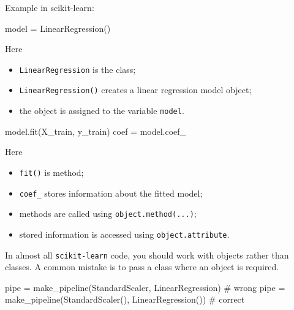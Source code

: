 \documentclass[
  letterpaper,
  DIV=11,
  numbers=noendperiod]{scrreprt}
\newenvironment{Shaded}{\begin{snugshade}}{\end{snugshade}}
\newcommand{\CommentTok}[1]{\textcolor[rgb]{0.37,0.37,0.37}{#1}}
\newcommand{\NormalTok}[1]{\textcolor[rgb]{0.00,0.23,0.31}{#1}}
\newcommand{\OperatorTok}[1]{\textcolor[rgb]{0.37,0.37,0.37}{#1}}
\providecommand{\tightlist}{%
  \setlength{\itemsep}{0pt}\setlength{\parskip}{0pt}}
\theoremstyle{definition}
\theoremstyle{definition}
\theoremstyle{plain}
\theoremstyle{plain}
\theoremstyle{remark}
\begin{document}
Example in scikit-learn:

\begin{Shaded}
\begin{Highlighting}[]
\NormalTok{model }\OperatorTok{=}\NormalTok{ LinearRegression()}
\end{Highlighting}
\end{Shaded}

Here

\begin{itemize}
\tightlist
\item
  \texttt{LinearRegression} is the class;
\item
  \texttt{LinearRegression()} creates a linear regression model object;
\item
  the object is assigned to the variable \texttt{model}.
\end{itemize}

\begin{Shaded}
\begin{Highlighting}[]
\NormalTok{model.fit(X\_train, y\_train)}
\NormalTok{coef }\OperatorTok{=}\NormalTok{ model.coef\_}
\end{Highlighting}
\end{Shaded}

Here

\begin{itemize}
\tightlist
\item
  \texttt{fit()} is method;
\item
  \texttt{coef\_} stores information about the fitted model;
\item
  methods are called using \texttt{object.method(...)};
\item
  stored information is accessed using \texttt{object.attribute}.
\end{itemize}

In almost all \texttt{scikit-learn} code, you should work with objects
rather than classes. A common mistake is to pass a class where an object
is required.

\begin{Shaded}
\begin{Highlighting}[]
\NormalTok{pipe }\OperatorTok{=}\NormalTok{ make\_pipeline(StandardScaler, LinearRegression)     }\CommentTok{\# wrong}
\NormalTok{pipe }\OperatorTok{=}\NormalTok{ make\_pipeline(StandardScaler(), LinearRegression()) }\CommentTok{\# correct}
\end{Highlighting}
\end{Shaded}
\end{document}
